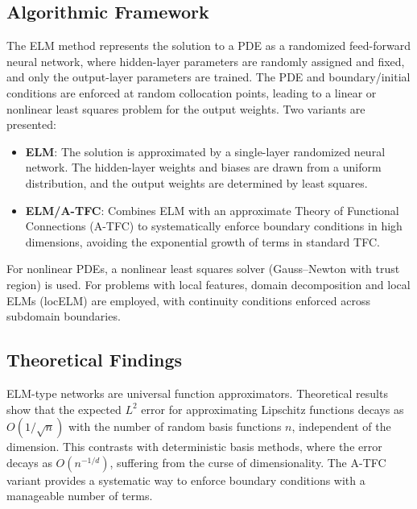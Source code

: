 \documentclass[11pt]{article}
\begin{document}
\subsection{Algorithmic Framework}
The ELM method represents the solution to a PDE as a randomized feed-forward neural network, where hidden-layer parameters are randomly assigned and fixed, and only the output-layer parameters are trained. The PDE and boundary/initial conditions are enforced at random collocation points, leading to a linear or nonlinear least squares problem for the output weights. Two variants are presented:
\begin{itemize}
    \item \textbf{ELM}: The solution is approximated by a single-layer randomized neural network. The hidden-layer weights and biases are drawn from a uniform distribution, and the output weights are determined by least squares.
    \item \textbf{ELM/A-TFC}: Combines ELM with an approximate Theory of Functional Connections (A-TFC) to systematically enforce boundary conditions in high dimensions, avoiding the exponential growth of terms in standard TFC.
\end{itemize}
For nonlinear PDEs, a nonlinear least squares solver (Gauss–Newton with trust region) is used. For problems with local features, domain decomposition and local ELMs (locELM) are employed, with continuity conditions enforced across subdomain boundaries.

\subsection{Theoretical Findings}
ELM-type networks are universal function approximators. Theoretical results show that the expected $L^2$ error for approximating Lipschitz functions decays as $O(1/\sqrt{n})$ with the number of random basis functions $n$, independent of the dimension. This contrasts with deterministic basis methods, where the error decays as $O(n^{-1/d})$, suffering from the curse of dimensionality. The A-TFC variant provides a systematic way to enforce boundary conditions with a manageable number of terms.
\end{document}
